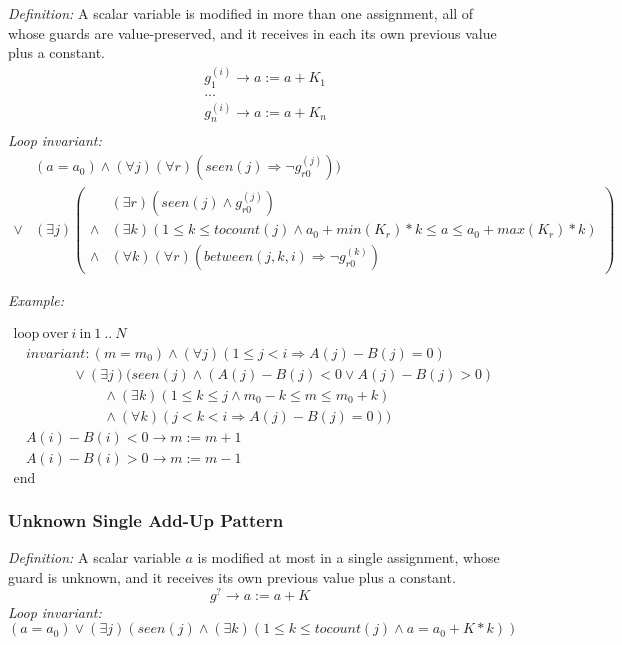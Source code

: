 \documentclass[a4paper,10pt]{article}
\newcommand{\idx}{\ensuremath{i}\xspace}
\newcommand{\at}[1]{{(#1)}}
\newcommand{\KWloop}{\ensuremath{\mathrm{loop}~}}
\newcommand{\KWend}{\ensuremath{\mathrm{end}~}}
\newcommand{\KWover}{\ensuremath{\mathrm{over}~}}
\newcommand{\KWin}{\ensuremath{~\mathrm{in}~}}
\newcommand{\impl}{\ensuremath{\Longrightarrow}}
\newcommand{\seen}[1]{\ensuremath{\mathit{seen}(#1)}\xspace}
\newcommand{\tocount}[1]{\ensuremath{\mathit{tocount}(#1)}\xspace}
\newcommand{\between}[3]{\ensuremath{\mathit{between}{(#1,#2,#3)}}\xspace}
\newcommand{\loopinvariant}{\noindent\textit{Loop invariant:}\xspace}
\newcommand{\patterndef}{\noindent\textit{Definition:}\xspace}
\newcommand{\patternexample}{\noindent\textit{Example:}\xspace}
\begin{document}
\patterndef A scalar variable is modified in more than one assignment, all of
whose guards are value-preserved, and it receives in each its own previous value
plus a constant.
%
\begin{eqnarray*}
&g_1^\at{\idx} \rightarrow a := a + K_1\\
&...\\
&g_n^\at{\idx} \rightarrow a := a + K_n\\
\end{eqnarray*}
%
\loopinvariant
%
\begin{eqnarray*}
&(a = a_0) \land (\forall j)(\forall r)( \seen{j} \impl \neg g_{r0}^\at{j})) \\
\lor 
& (\exists j)
\left(\begin{array}{cl}
&(\exists r)(\seen{j} \land g_{r0}^\at{j}) \\
\land& (\exists k)(1 \leq k \leq \tocount{j} \land a_0 + \mathit{min}(K_r) * k \leq a \leq a_0 + \mathit{max}(K_r) * k) \\
\land& (\forall k)(\forall r)(\between{j}{k}{\idx} \impl \neg g_{r0}^\at{k})
\end{array}\right)
\end{eqnarray*}

\bigskip
\patternexample

\medskip
$\begin{array}{l}
  \KWloop \KWover i \KWin 1~..~N \\
  ~~~~ \textit{invariant}: (m = m_0) \land (\forall j)(1\leq j < i \impl A(j)-B(j) = 0)\\
  ~~~~~~~~~~~~~~~~~~~ \lor (\exists j)(\seen{j} \land (A(j)-B(j) < 0 \lor A(j)-B(j) > 0) \\
  ~~~~~~~~~~~~~~~~~~~~~~~~~~~~~ \land (\exists k)(1 \leq k \leq j \land m_0-k \leq m \leq m_0 +k) \\
  ~~~~~~~~~~~~~~~~~~~~~~~~~~~~~ \land (\forall k)(j < k < i \impl A(j)-B(j) = 0))\\
  ~~~~ A(i)-B(i) < 0 \rightarrow m := m+1\\
  ~~~~ A(i)-B(i) > 0 \rightarrow m := m-1\\
  \KWend
\end{array}$

\subsubsection*{Unknown Single Add-Up Pattern}

\patterndef A scalar variable $a$ is modified at most in a single assignment, whose
guard is unknown, and it receives its own previous value plus a constant.
%
$$g^? \rightarrow a := a + K$$
%
\loopinvariant
%
$$(a = a_0) \lor (\exists j)(\seen{j} \land (\exists k)(1 \leq k \leq \tocount{j} \land a = a_0 + K * k))$$
\end{document}
